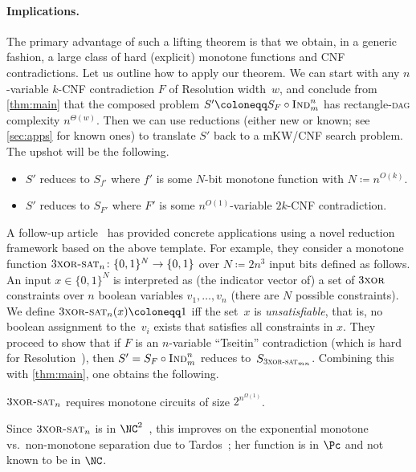 \documentclass{toc}
\newcommand{\Ind}{\textsc{Ind}}
\newcommand{\DAGspace}{\textsc{dag}\xspace}
\newcommand{\Xor}{\textsc{xor}}
\newcommand{\XorSat}{\textsc{xor-sat}}
\newcommand{\ThreeXor}{3\Xor}
\newcommand{\ThreeXorSat}{3\XorSat}
\newcommand{\bit}{\{0,1\}}
\begin{document}
\paragraph{Implications.}
The primary advantage of such a lifting theorem is that we obtain, in a generic fashion, a large class of hard (explicit) monotone functions and CNF contradictions. Let us outline how to apply our theorem. We can start with any $n$-variable $k$-CNF contradiction $F$ of Resolution width~$w$, and conclude from \autoref{thm:main} that the composed problem $S'\coloneqq S_F\circ\Ind^n_m$ has rectangle-\DAGspace complexity $n^{\Theta(w)}$. Then we can use reductions (either new or known; see \autoref{sec:apps} for known ones) to translate $S'$ back to a mKW/CNF search problem. The upshot will be 
%
the following.   %
\begin{itemize}
\item $S'$ reduces to $S_{f'}$ where $f'$ is some $N$-bit monotone function with $N\coloneqq n^{O(k)}$.
\item $S'$ reduces to $S_{F'}$ where $F'$ is some $n^{O(1)}$-variable $2k$-CNF contradiction. 
\end{itemize}

A follow-up
%
article~\cite{goos19monotone}  %
has provided concrete applications using a novel reduction framework based on the above template. For example, they consider a monotone function $\ThreeXorSat_n\colon\bit^N\to\bit$ over $N\coloneqq 2n^3$ input bits defined as follows. An input $x\in\bit^N$ is interpreted as (the indicator vector of) a set of $\ThreeXor$ constraints over $n$ boolean variables $v_1,\ldots,v_n$ (there are $N$ possible constraints). We define $\ThreeXorSat_n(x)\coloneqq 1$ iff the set~$x$ is \emph{unsatisfiable}, that is, no boolean assignment to the~$v_i$ exists that satisfies all constraints in $x$. They proceed to show that if $F$ is an $n$-variable ``Tseitin'' contradiction (which is hard for Resolution~\cite{urquhart87hard}), then $S'=S_F \circ \Ind_m^n$ reduces to~$S_{\ThreeXorSat_{mn}}$. Combining this with \autoref{thm:main}, one obtains the following.

\begin{corollary}\label{cor:xorsat-lb}
$\ThreeXorSat_n$ requires monotone circuits of size $2^{n^{\Omega(1)}}$.
\end{corollary}

Since $\ThreeXorSat_n$ is in $\NC^2$~\cite{mulmuley87fast}, this improves on the exponential monotone vs.\ non-mono\-tone separation due to Tardos~\cite{tardos88gap}; her function is in $\Pc$ and not known to be in $\NC$.
\end{document}
